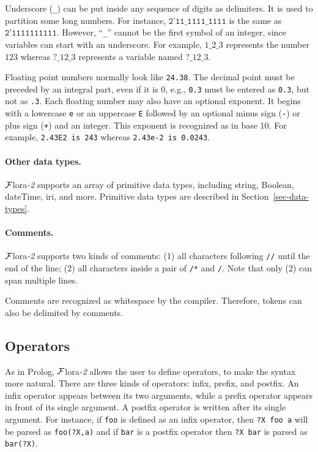 \documentclass[11pt]{article}
\newcommand{\FLSYSTEM}{{\mbox{\sc ${\cal F}${lora}\rm\emph{-2}}}\xspace}
\begin{document}
Underscore (\texttt{\_}) can be put inside any sequence of digits as
delimiters. It is used to partition some long numbers. For instance,
$\texttt{2'11\_1111\_1111}$ is the same as $\texttt{2'1111111111}$.
However, ``\texttt{\_}'' cannot be the first symbol of an integer, since
variables can start with an underscore. For example, $1\_2\_3$ represents
the number $123$ whereas $?\_12\_3$ represents a variable named $?\_12\_3$.

Floating point numbers normally look like {\tt 24.38}. The decimal point
must be preceded by an integral part, even if it is 0, e.g., {\tt 0.3}
must be entered as {\tt 0.3}, but not as {\tt .3}. Each floating
number may also have an optional exponent. It begins with a lowercase
{\tt e} or an uppercase {\tt E} followed by an optional minus sign
({\tt -}) or plus sign ({\tt +}) and an integer. This exponent is
recognized as in base 10. For example,
\mbox{\tt 2.43E2 is 243} whereas
\mbox{\tt 2.43e-2 is 0.0243}.

\paragraph{Other data types.}
\FLSYSTEM supports an array of primitive data types, including string, Boolean,
dateTime, iri, and more. Primitive data types are described in
Section~\ref{sec-data-types}.

\paragraph{Comments.}

%
\FLSYSTEM supports two kinds of comments: (1) all characters following
{\tt //} until the end of the line; (2) all characters inside a pair of
{\tt /*} and {\tt */}. Note that only (2) can span multiple lines.

Comments are recognized as whitespace by the compiler.  Therefore,
tokens can also be delimited by comments.


\subsection{Operators}


As in Prolog, \FLSYSTEM allows the user to define operators, to make the
syntax more natural.
There are three kinds of operators: infix,
prefix, and postfix. An infix operator appears between its two arguments,
while a prefix operator appears in front of its single argument. A postfix
operator is written
after its single argument. For instance, if {\tt foo} is defined as an
infix operator, then {\tt ?X foo a} will be parsed as {\tt foo(?X,a)} and if
{\tt bar} is a postfix operator then {\tt ?X bar} is parsed as {\tt bar(?X)}. 
\end{document}
